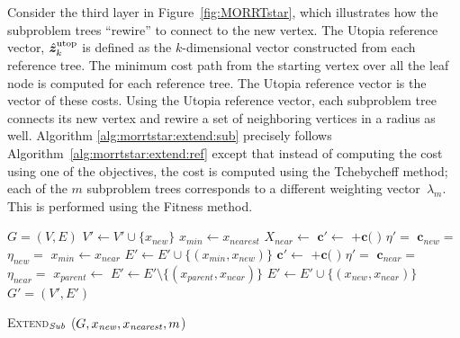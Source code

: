 \documentclass{article}
\begin{document}
Consider the third layer in Figure~\ref{fig:MORRTstar}, which illustrates how the subproblem trees ``rewire'' to connect to the new vertex.  
The Utopia reference vector, $ \hat{\bm{z}}_{k}^{\rm utop} $ is defined as the $k$-dimensional vector constructed from each reference tree.  
The minimum cost path from the starting vertex over all the leaf node is computed for each reference tree.  
The Utopia reference vector is the vector of these costs. 
Using the Utopia reference vector, each subproblem tree connects its new vertex and rewire a set of neighboring vertices in a radius as well. 
Algorithm \ref{alg:morrtstar:extend:sub} precisely follows Algorithm~\ref{alg:morrtstar:extend:ref} except that instead of computing the cost using one of the objectives, the cost is computed using the Tchebycheff method; each of the $m$ subproblem trees corresponds to a different weighting vector~$\lambda_m$.  
This is performed using the {\sc Fitness} method.

\begin{algorithm}[hbtp]
\begin{algorithmic}[1]
	\Return $G=(V,E)$ 
\EndIf
\State $ V' \leftarrow V' \cup \{ x_{new} \} $
\State $ x_{min} \leftarrow x_{nearest} $
\State $ X_{near} \leftarrow $ 
			\State $ \bm{c}' \leftarrow $  $ + \bm{c}( $  $ ) $ 
			\State $ \eta' =  $ 
			\State $ \bm{c}_{new} = $  
			\State $ \eta_{new} = $ 
				\State $ x_{min} \leftarrow x_{near} $
			\EndIf
		\EndIf
	\EndFor
	\State $ E' \leftarrow E' \cup \{ ( x_{min}, x_{new} ) \} $
{}
		\State $ \bm{c}' \leftarrow $  $ + \bm{c}( $  $ ) $ 
		\State $ \eta' =  $ 
		\State $ \bm{c}_{near} = $  
		\State $ \eta_{near} = $ 
			\State $ x_{parent} \leftarrow $ 
			\State $ E' \leftarrow E' \setminus \{ ( x_{parent}, x_{near} ) \} $
			\State $ E' \leftarrow E' \cup \{ ( x_{new}, x_{near} ) \} $
		\EndIf
	\EndIf
\EndFor
\Return $ G' = (V', E') $ 
\end{algorithmic}
\caption{ \textsc{Extend}$_{\it Sub} $ ($ G, x_{\it new}, x_{\it nearest},m$) }
\label{alg:morrtstar:extend:sub}
\end{algorithm} 
\end{document}
